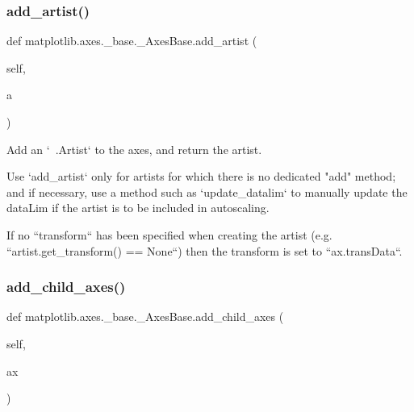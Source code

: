 \mbox{\label{classmatplotlib_1_1axes_1_1__base_1_1__AxesBase_af8372347b2926f2e3a7100b1e8ad87e2}} 
\subsubsection{\texorpdfstring{add\+\_\+artist()}{add\_artist()}}
{\footnotesize\ttfamily def matplotlib.\+axes.\+\_\+base.\+\_\+\+Axes\+Base.\+add\+\_\+artist (\begin{DoxyParamCaption}\item[{}]{self,  }\item[{}]{a }\end{DoxyParamCaption})}

\begin{DoxyVerb}Add an `~.Artist` to the axes, and return the artist.

Use `add_artist` only for artists for which there is no dedicated
"add" method; and if necessary, use a method such as `update_datalim`
to manually update the dataLim if the artist is to be included in
autoscaling.

If no ``transform`` has been specified when creating the artist (e.g.
``artist.get_transform() == None``) then the transform is set to
``ax.transData``.
\end{DoxyVerb}
 \mbox{\label{classmatplotlib_1_1axes_1_1__base_1_1__AxesBase_adf28977e60b5e7467b21b8c26c5d10ba}} 
\subsubsection{\texorpdfstring{add\+\_\+child\+\_\+axes()}{add\_child\_axes()}}
{\footnotesize\ttfamily def matplotlib.\+axes.\+\_\+base.\+\_\+\+Axes\+Base.\+add\+\_\+child\+\_\+axes (\begin{DoxyParamCaption}\item[{}]{self,  }\item[{}]{ax }\end{DoxyParamCaption})}

